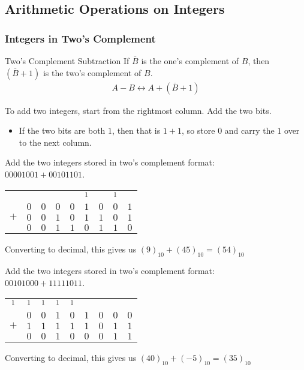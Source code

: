 \documentclass[\main/notes.tex]{subfiles}
\begin{document}
			\subsection{Arithmetic Operations on Integers}
				\subsubsection{Integers in Two's Complement}
					\begin{definition}{Two's Complement Subtraction}
						If $\overline{B}$ is the one's complement of $B$, then $\left(\overline{B} + 1\right)$ is the two's complement of $B$.
						\begin{align*}
							A - B \leftrightarrow A + \left(\overline{B} + 1\right)
						\end{align*}
					\end{definition}
					To add two integers, start from the rightmost column. Add the two bits.
					\begin{itemize}
						\item If the two bits are both $1$, then that is $1 + 1$, so store $0$ and carry the $1$ over to the next column.
					\end{itemize}
					\begin{example}
						Add the two integers stored in two's complement format:\\
						$00001001 + 00101101$.
						\begin{center}
							\begin{tabular}{ccccccccc}
								    &     &     &     &     & $^{1}$ &     & $^{1}$ & \\
								    & $0$ & $0$ & $0$ & $0$ & $1$    & $0$ & $0$    & $1$\\
								$+$ & $0$ & $0$ & $1$ & $0$ & $1$    & $1$ & $0$    & $1$\\
								\midrule
								    & $0$ & $0$ & $1$ & $1$ & $0$ & $1$ & $1$ & $0$
							\end{tabular}
						\end{center}
						Converting to decimal, this gives us $(9)_{10} + (45)_{10} = (54)_{10}$
					\end{example}
					\begin{example}
						Add the two integers stored in two's complement format:\\
						$00101000 + 11111011$.
						\begin{center}
							\begin{tabular}{ccccccccc}
								$^{1}$ & $^{1}$ & $^{1}$ & $^{1}$ & $^{1}$ &     &     &     &    \\
								       & $0$    & $0$    & $1$    & $0$    & $1$ & $0$ & $0$ & $0$\\
								$+$    & $1$    & $1$    & $1$    & $1$    & $1$ & $0$ & $1$ & $1$\\
								\midrule
								       & $0$    & $0$    & $1$    & $0$    & $0$ & $0$ & $1$ & $1$
							\end{tabular}
						\end{center}
						Converting to decimal, this gives us $(40)_{10} + (-5)_{10} = (35)_{10}$
					\end{example}
\end{document}
